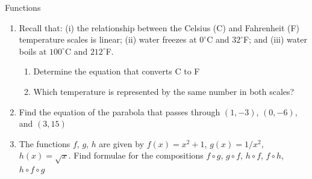 \documentclass[9pt]{beamer}
\begin{document}
\begin{frame}{Functions}
    
    \begin{enumerate}[leftmargin = 0.5cm, label = (\alph*), rightmargin = 0.2cm]

    \item Recall that: (i) the relationship between the Celsius (C) and Fahrenheit (F) temperature scales is linear; (ii) water freezes at $0^\circ$C and $32^\circ$F; and (iii) water boils at $100^\circ$C and $212^\circ$F.

    \begin{enumerate}[leftmargin = 0.5cm, label = (\alph*), rightmargin = 0.2cm]
        \item Determine the equation that converts C to F \\
        \item Which temperature is represented by the same number in both scales?
    \end{enumerate}
    
    \item Find the equation of the parabola that passes through $(1, -3)$, $(0, -6)$, and $(3, 15)$

    \item The functions $f$, $g$, $h$ are given by $f(x) = x^2 + 1$, $g(x) = 1/x^2$, $h(x) = \sqrt{x}$. Find formulae for the compositions $f\circ g$, $g\circ f$, $h\circ f$, $f\circ h$, $h\circ f\circ g$
    
    \end{enumerate}
    
\end{frame}
\end{document}
